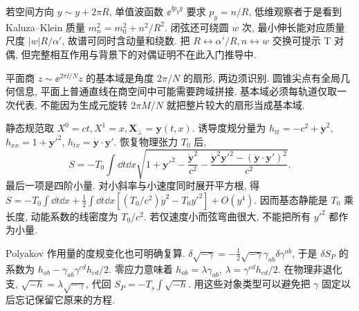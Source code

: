若空间方向 $y\sim y+2\pi R$, 单值波函数 $\ee^{\ii p_y y}$ 要求 $p_y=n/R$, 低维观察者于是看到 Kaluza--Klein 质量 $m_n^2=m_0^2+n^2/R^2$. 闭弦还可绕圆 $w$ 次, 最小伸长能对应质量尺度 $|w|R/\alpha'$, 故谱可同时含动量和绕数. 把 $R\leftrightarrow\alpha'/R,n\leftrightarrow w$ 交换可提示 T 对偶, 但完整相互作用与背景下的对偶证明不在此入门推导中.

平面商 $z\sim\ee^{2\pi\ii/N}z$ 的基本域是角度 $2\pi/N$ 的扇形, 两边须识别. 圆锥尖点有全局几何信息, 平面上普通直线在商空间中可能需要跨域拼接. 基本域必须每轨道仅取一次代表, 不能因为生成元旋转 $2\pi M/N$ 就把整片较大的扇形当成基本域.

静态规范取 $X^0=ct,X^1=x,\boldsymbol X_\perp=\boldsymbol y(t,x)$. 诱导度规分量为 $h_{tt}=-c^2+\dot{\boldsymbol y}^2$, $h_{xx}=1+\boldsymbol y'^2$, $h_{tx}=\dot{\boldsymbol y}\cdot\boldsymbol y'$. 恢复物理张力 $T_0$ 后,
\[
S=-T_0\int\dd t\dd x\sqrt{1+\boldsymbol y'^2-
\frac{\dot{\boldsymbol y}^2}{c^2}
-\frac{\dot{\boldsymbol y}^2\boldsymbol y'^2-(\dot{\boldsymbol y}\cdot\boldsymbol y')^2}{c^2}}.
\]
最后一项是四阶小量. 对小斜率与小速度同时展开平方根, 得 $S=-T_0\int\dd t\dd x+\frac12\int\dd t\dd x[(T_0/c^2)\dot y^2-T_0y'^2]+O(y^4)$. 因而基态静能是 $T_0$ 乘长度, 动能系数的线密度为 $T_0/c^2$. 若仅速度小而弦弯曲很大, 不能把所有 $y'^2$ 都作为小量.

Polyakov 作用量的度规变化也可明确复算. $\delta\sqrt{-\gamma}=-\frac12\sqrt{-\gamma}\gamma_{ab}\delta\gamma^{ab}$, 于是 $\delta S_P$ 的系数为 $h_{ab}-\gamma_{ab}\gamma^{cd}h_{cd}/2$. 零应力意味着 $h_{ab}=\lambda\gamma_{ab}$, $\lambda=\gamma^{cd}h_{cd}/2$. 在物理非退化支, $\sqrt{-h}=\lambda\sqrt{-\gamma}$, 代回 $S_P=-T_s\int\sqrt{-h}$. 用这些对象类型可以避免把 $\gamma$ 固定以后忘记保留它原来的方程.

